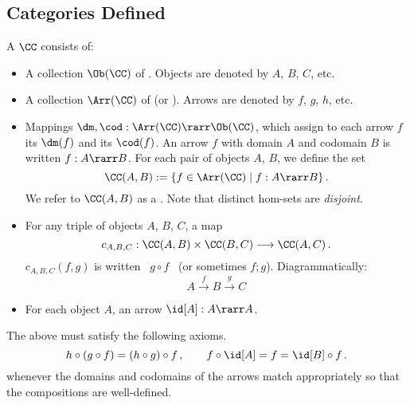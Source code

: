 \documentclass[12pt]{article}
\begin{document}
%


\subsection{Categories Defined}
\begin{mydefinition}
A  $\CC$ consists of:
\begin{itemize}
  \item A collection $\Ob(\CC)$ of . Objects are denoted by $A$, $B$, $C$, etc.
  \item A collection $\Arr(\CC)$ of  (or ). Arrows are denoted by $f$, $g$, $h$, etc.
  \item Mappings $\dm, \cod : \Arr(\CC) \rarr \Ob(\CC)$, which assign to each arrow $f$ its  $\dm(f)$ and its  $\cod(f)$. An arrow $f$ with domain $A$ and codomain $B$  is written
  $f:A\rarr B$.  For each pair of objects $A$, $B$, we define the  set
  \[ \CC(A,B) := \{ f \in \Arr(\CC) \mid f : A \rarr B \} \, . \]
  We refer to $\CC(A, B)$ as a . Note that distinct hom-sets are \emph{disjoint}.
    \item For any triple of objects $A$, $B$, $C$, a  map
    \[ c_{A,B,C} : \CC (A, B) \times \CC (B, C) \longrightarrow \CC (A, C)\,. \]
  $c_{A, B, C}(f, g)$ is written \ $g\circ\!f$ \ (or sometimes $f ; g$). Diagrammatically:
  \[ A \stackrel{f}{\longrightarrow} B \stackrel{g}{\longrightarrow} C \]
  \item For each object $A$, an  arrow $\id[A]:A\rarr A$.
\end{itemize}
The above must satisfy the following axioms.
\[ h \circ (g \circ f) = (h \circ g) \circ f \,,\qquad f \circ \id[A] = f = \id[B] \circ f\,. \]
whenever the domains and codomains of the arrows match appropriately so that the compositions are well-defined. \deq
\end{mydefinition}
\end{document}
